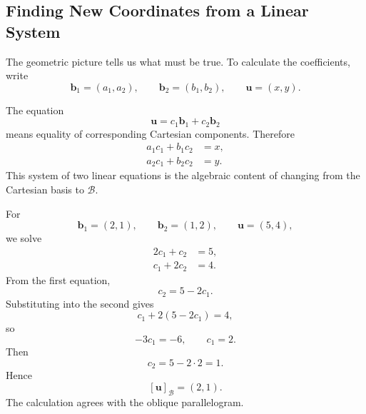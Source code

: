 \subsection{Finding New Coordinates from a Linear System}

The geometric picture tells us what must be true. To calculate the coefficients,
write
\[
\mathbf b_1=(a_1,a_2),
\qquad
\mathbf b_2=(b_1,b_2),
\qquad
\mathbf u=(x,y).
\]

\begin{derivationbox}
The equation
\[
\mathbf u=c_1\mathbf b_1+c_2\mathbf b_2
\]
means equality of corresponding Cartesian components. Therefore
\[
\boxed{
\begin{aligned}
 a_1c_1+b_1c_2&=x,\\
 a_2c_1+b_2c_2&=y.
\end{aligned}}
\]
This system of two linear equations is the algebraic content of changing from
the Cartesian basis to $\mathcal B$.
\end{derivationbox}

\begin{examplebox}
For
\[
\mathbf b_1=(2,1),
\qquad
\mathbf b_2=(1,2),
\qquad
\mathbf u=(5,4),
\]
we solve
\[
\begin{aligned}
2c_1+c_2&=5,\\
c_1+2c_2&=4.
\end{aligned}
\]
From the first equation,
\[
c_2=5-2c_1.
\]
Substituting into the second gives
\[
c_1+2(5-2c_1)=4,
\]
so
\[
-3c_1=-6,
\qquad
c_1=2.
\]
Then
\[
c_2=5-2\cdot2=1.
\]
Hence
\[
\boxed{[\mathbf u]_{\mathcal B}=(2,1)}.
\]
The calculation agrees with the oblique parallelogram.
\end{examplebox}
